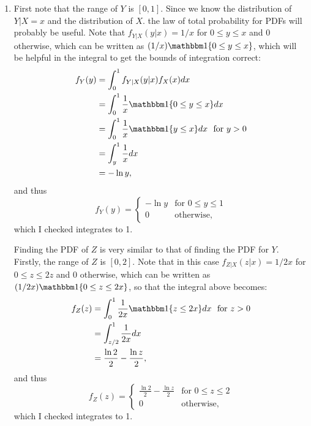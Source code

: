 \begin{problem}{14}$ $

\begin{enumerate}
\item  First note that the range of $Y$ is $[0, 1]$.  Since we know the distribution of $Y|X=x$ and the distribution of $X$. the law of total probability for PDFs will probably be useful.  Note that $f_{Y|X}(y|x) = 1/x$ for $0 \le y \le x$ and 0 otherwise, which can be written as $(1/x)\mathbbm 1 \{0 \le y \le x \}$, which will be helpful in the integral to get the bounds of integration correct:
\begin{align*}
f_Y(y)& = \int_0^1 f_{Y|X}(y|x)f_X(x)dx \\
&= \int_0^1\frac{1}{x}\mathbbm 1 \{0 \le y \le x \} dx \\
&= \int_0^1\frac{1}{x}\mathbbm 1 \{y \le x \} dx ~~\mathrm{for~}y>0\\
&=\int_y^1\frac{1}{x} dx \\
&= - \ln y,
\end{align*}
and thus
\[
  f_Y(y) =
  \begin{cases}
                                   -\ln y & \text{for $0\le y\le1$} \\
                                   0 & \text{otherwise},
  \end{cases}
\]
which I checked integrates to 1. 

Finding the PDF of $Z$ is very similar to that of finding the PDF for $Y$.  Firstly, the range of $Z$ is $[0, 2]$.  Note that in this case $f_{Z|X}(z|x) = 1/2x$ for $0 \le z \le 2z$ and 0 otherwise, which can be written as $(1/2x)\mathbbm 1 \{0 \le z \le 2x \}$, so that the integral above becomes:
\begin{align*}
f_Z(z) &= \int_0^1\frac{1}{2x}\mathbbm 1 \{z \le 2x \} dx ~~\mathrm{for~}z>0\\
&=\int_{z/2}^1\frac{1}{2x} dx \\
&= \frac{\ln 2}{2}- \frac{\ln z}{2},
\end{align*}
and thus
\[
  f_Z(z) =
  \begin{cases}
                                   \frac{\ln 2}{2}- \frac{\ln z}{2} & \text{for $0\le z\le 2$} \\
                                   0 & \text{otherwise},
  \end{cases}
\]
which I checked integrates to 1. 


\end{enumerate}
\end{problem}
